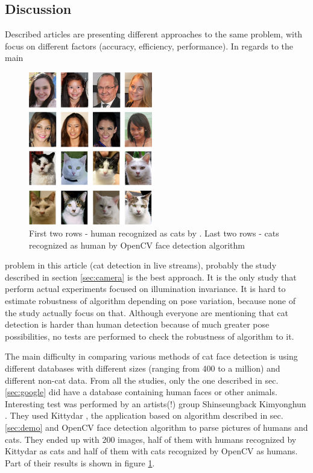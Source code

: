 \documentclass[hyperref]{acmtrans2e}
\begin{document}
\subsection{Discussion}

Described articles are presenting different approaches to the same problem, with focus on different factors (accuracy, efficiency, performance). In regards to the main 
\begin{figure}
\centering
    \includegraphics[width=0.48\textwidth]{cat_vs_human}
\centering
  \caption{First two rows - human recognized as cats by \protect\cite{demo:2013}. Last two rows - cats recognized as human by OpenCV face detection algorithm}
  \label{fig:cat_vs_human}
\end{figure}
problem in this article (cat detection in live streams), probably the study described in section \ref{sec:camera} is the best approach. It is the only study that perform actual experiments focused on illumination invariance. It is hard to estimate robustness of algorithm depending on pose variation, because none of the study actually focus on that. Although everyone are mentioning that cat detection is harder than human detection because of much greater pose possibilities, no tests are performed to check the robustness of algorithm to it.

The main difficulty in comparing various methods of cat face detection is using different databases with different sizes (ranging from 400 to a million) and different non-cat data. From all the studies, only the one described in sec. \ref{sec:google} did have a database containing human faces or other animals. Interesting test was performed by an artists(!) group Shinseungback Kimyonghun \cite{vs:2013}. They used Kittydar \cite{demo:2013}, the application based on algorithm described in sec. \ref{sec:demo} and OpenCV face detection algorithm to parse pictures of humans and cats. They ended up with 200 images, half of them with humans recognized by Kittydar as cats and half of them with cats recognized by OpenCV as humans. Part of their results is shown in figure \ref{fig:cat_vs_human}.
\end{document}
